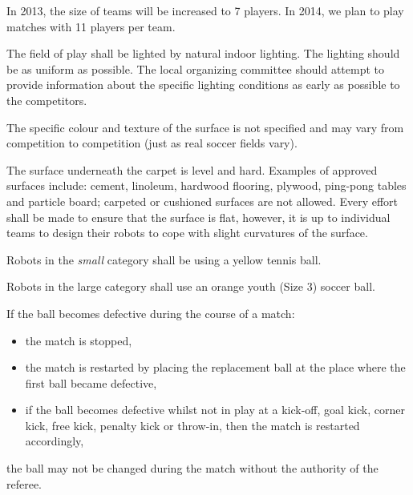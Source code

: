 \documentclass[12pt]{hurocup}
\begin{document}
\begin{decisions}

\item In 2013, the size of teams will be increased to 7 players. In
  2014, we plan to play matches with 11 players per team.

\item The field of play shall be lighted by natural indoor
  lighting. The lighting should be as uniform as possible. The local
  organizing committee should attempt to provide information about the
  specific lighting conditions as early as possible to the
  competitors.
  
\item The specific colour and texture of the surface is not specified
  and may vary from competition to competition (just as real soccer
  fields vary). 

\item The surface underneath the carpet is level and
  hard. Examples of approved surfaces include: cement, linoleum,
  hardwood flooring, plywood, ping-pong tables and particle board;
  carpeted or cushioned surfaces are not allowed. Every effort shall
  be made to ensure that the surface is flat, however, it is up to
  individual teams to design their robots to cope with slight
  curvatures of the surface.

\end{decisions}

\label{law:ball}

\begin{lawlist}[US]
\item Robots in the \textit{small} category shall be using a yellow
 tennis ball.

\item Robots in the large category shall use an orange youth (Size 3)
soccer ball. 

\item If the ball becomes defective during the course of a match:
  \begin{itemize}
  \item the match is stopped,
  \item the match is restarted by placing the replacement ball at the place where the first ball became defective, 
  \item if the ball becomes defective whilst not in play at a
    kick-off, goal kick, corner kick, free kick, penalty kick or
    throw-in, then the match is restarted accordingly,
  \end{itemize}
\item the ball may not be changed during the match without the authority of the referee.

\end{lawlist}
\end{document}
